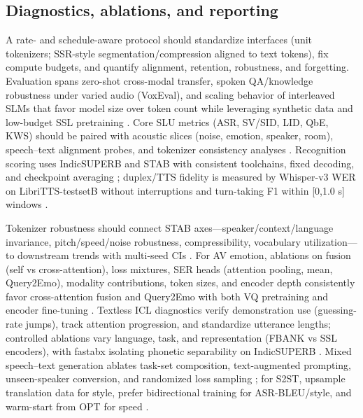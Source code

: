 \documentclass{article}
\begin{document}
\subsection{Diagnostics, ablations, and reporting} \label{subsec:diagnostics,ablations,andreporting}
A rate- and schedule-aware protocol should standardize interfaces (unit tokenizers; SSR-style segmentation/compression aligned to text tokens), fix compute budgets, and quantify alignment, retention, robustness, and forgetting. Evaluation spans zero-shot cross-modal transfer, spoken QA/knowledge robustness under varied audio (VoxEval), and scaling behavior of interleaved SLMs that favor model size over token count while leveraging synthetic data and low-budget SSL pretraining \cite{cui2025voxevalbenchmarkingknowledgeunderstandin,maimon2025scalinganalysisinterleavedspeechtextlang,tan2025ssralignmentawaremodalityconnectorspeech,chen2023reducingbarriersselfsupervisedlearninghu,entry2025towardjointlanguagemodelingspeechunitste}. Core SLU metrics (ASR, SV/SID, LID, QbE, KWS) should be paired with acoustic slices (noise, emotion, speaker, room), speech--text alignment probes, and tokenizer consistency analyses \cite{har-tuv2025pastphoneticacousticspeechtokenizer,turetzky2024lastlanguagemodelawarespeechtokenization,bai2025dmelspeechtokenizationmadesimple,entry2025indicsuperbspeechprocessinguniversalperf,maimon2025salmonsuiteacousticlanguagemodelevaluati}. Recognition scoring uses IndicSUPERB and STAB with consistent toolchains, fixed decoding, and checkpoint averaging \cite{vashishth2024stabspeechtokenizerassessmentbenchmark,entry2025indicsuperbspeechprocessinguniversalperf}; duplex/TTS fidelity is measured by Whisper-v3 WER on LibriTTS-testsetB without interruptions and turn-taking F1 within [0,1.0 s] windows \cite{ma2024languagemodelcanlistenwhilespeaking}.

Tokenizer robustness should connect STAB axes---speaker/context/language invariance, pitch/speed/noise robustness, compressibility, vocabulary utilization---to downstream trends with multi-seed CIs \cite{vashishth2024stabspeechtokenizerassessmentbenchmark}. For AV emotion, ablations on fusion (self vs cross-attention), loss mixtures, SER heads (attention pooling, mean, Query2Emo), modality contributions, token sizes, and encoder depth consistently favor cross-attention fusion and Query2Emo with both VQ pretraining and encoder fine-tuning \cite{sadok2025vectorquantizedmaskedautoencoderaudiovis}. Textless ICL diagnostics verify demonstration use (guessing-rate jumps), track attention progression, and standardize utterance lengths; controlled ablations vary language, task, and representation (FBANK vs SSL encoders), with fastabx isolating phonetic separability on IndicSUPERB \cite{hsu2024exploringcontextlearningtextlessspeechla,poli2025fastabxlibraryefficientcomputationabxdis,entry2025indicsuperbspeechprocessinguniversalperf}. Mixed speech--text generation ablates task-set composition, text-augmented prompting, unseen-speaker conversion, and randomized loss sampling \cite{wu2024speechcomposerunifyingmultiplespeechtask}; for S2ST, upsample translation data for style, prefer bidirectional training for ASR-BLEU/style, and warm-start from OPT for speed \cite{peng2024mslms2stmultitaskspeechlanguagemodeltext}.
\end{document}
